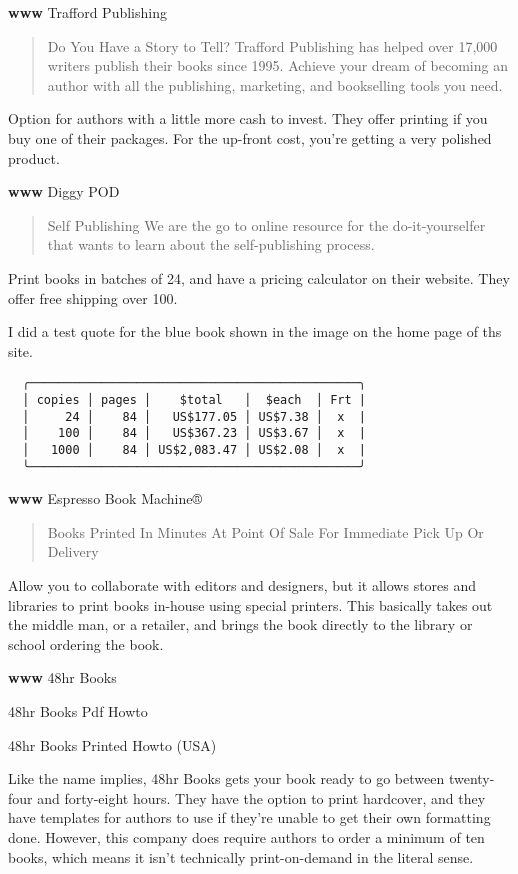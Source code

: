 \documentclass[
]{article}
\begin{document}
\textbf{www} Trafford Publishing

\begin{quote}
Do You Have a Story to Tell? Trafford Publishing has helped over 17,000
writers publish their books since 1995. Achieve your dream of becoming
an author with all the publishing, marketing, and bookselling tools you
need.
\end{quote}

Option for authors with a little more cash to invest. They offer
printing if you buy one of their packages. For the up-front cost, you're
getting a very polished product.

\textbf{www} Diggy POD

\begin{quote}
Self Publishing We are the go to online resource for the
do-it-yourselfer that wants to learn about the self-publishing process.
\end{quote}

Print books in batches of 24, and have a pricing calculator on their
website. They offer free shipping over 100.

I did a test quote for the blue book shown in the image on the home page
of ths site.

\begin{verbatim}
  ╭──────────────────────────────────────────────╮ 
  │ copies │ pages │    $total   │  $each  │ Frt | 
  │     24 │    84 │   US$177.05 │ US$7.38 │  x  | 
  │    100 │    84 │   US$367.23 │ US$3.67 │  x  | 
  │   1000 │    84 │ US$2,083.47 │ US$2.08 │  x  | 
  ╰──────────────────────────────────────────────╯ 
\end{verbatim}

\textbf{www} Espresso Book Machine®

\begin{quote}
Books Printed In Minutes At Point Of Sale For Immediate Pick Up Or
Delivery
\end{quote}

Allow you to collaborate with editors and designers, but it allows
stores and libraries to print books in-house using special printers.
This basically takes out the middle man, or a retailer, and brings the
book directly to the library or school ordering the book.

\textbf{www} 48hr Books

48hr Books Pdf Howto

48hr Books Printed Howto (USA)

Like the name implies, 48hr Books gets your book ready to go between
twenty-four and forty-eight hours. They have the option to print
hardcover, and they have templates for authors to use if they're unable
to get their own formatting done. However, this company does require
authors to order a minimum of ten books, which means it isn't
technically print-on-demand in the literal sense.
\end{document}
